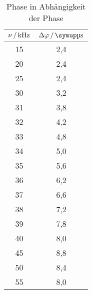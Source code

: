 \begin{table}
  \centering
  \begin{tabular}{c c}
    \toprule
    $\nu\,/\,\si{\kilo\hertz}$ & $\Delta\varphi\,/\,\su{\si{\micro\second}}$ \\
    \midrule
    15    &    2,4   \\
    20    &    2,4   \\
    25    &    2,4   \\
    30    &    3,2   \\
    31    &    3,8   \\
    32    &    4,2   \\
    33    &    4,8   \\
    34    &    5,0   \\
    35    &    5,6   \\
    36    &    6,2   \\
    37    &    6,6   \\
    38    &    7,2   \\
    39    &    7,8   \\
    40    &    8,0   \\
    45    &    8,8   \\
    50    &    8,4   \\
    55    &    8,0   \\
    \bottomrule
  \end{tabular}
  \caption{Phase in Abhängigkeit der Phase}
  \label{tab:phase}
\end{table}
